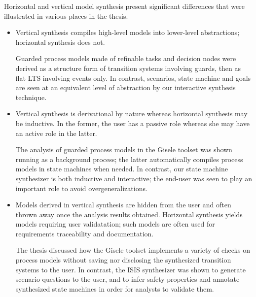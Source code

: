 Horizontal and vertical model synthesis present significant differences that were illustrated in various places in the thesis.
\begin{itemize}
\item Vertical synthesis compiles high-level models into lower-level abstractions; horizontal synthesis does not. 

Guarded process models made of refinable tasks and decision nodes were derived as a structure form of transition systems involving guards, then as flat LTS involving events only. In contrast, scenarios, state machine and goals are seen at an equivalent level of abstraction by our interactive synthesis technique.

\item Vertical synthesis is derivational by nature whereas horizontal synthesis may be inductive. In the former, the user has a passive role whereas she may have an active role in the latter.

The analysis of guarded process models in the Gisele toolset was shown running as a background process; the latter automatically compiles process models in state machines when needed. In contrast, our state machine synthesizer is both inductive and interactive; the end-user was seen to play an important role to avoid overgeneralizations.

\item Models derived in vertical synthesis are hidden from the user and often thrown away once the analysis results obtained. Horizontal synthesis yields models requiring user validatation; such models are often used for requirements traceability and documentation.

The thesis discussed how the Gisele toolset implements a variety of checks on process models without saving nor disclosing the synthesized transition systems to the user. In contrast, the ISIS synthesizer was shown to generate scenario questions to the user, and to infer safety properties and annotate synthesized state machines in order for analysts to validate them.

\end{itemize}



